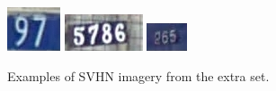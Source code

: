 \documentclass[12pt]{article}
\begin{document}
\begin{figure}
	\includegraphics[width=\linewidth]{images/extra/140.png}
\endminipage\hfill
{}
	\includegraphics[width=\linewidth]{images/extra/148.png}
\endminipage\hfill
{}
	\includegraphics[width=\linewidth]{images/extra/156.png}
\endminipage\hfill
\caption{Examples of SVHN imagery from the extra set.}
\label{fig:example_extra_imagery}
\end{figure}
\end{document}
